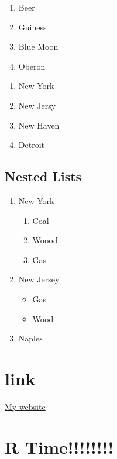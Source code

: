 \documentclass[]{article}
\providecommand{\tightlist}{%
  \setlength{\itemsep}{0pt}\setlength{\parskip}{0pt}}
\begin{document}
\begin{enumerate}
\def\labelenumi{\alph{enumi}.}
\tightlist
\item
  Beer
\item
  Guiness
\item
  Blue Moon
\item
  Oberon
\end{enumerate}

\begin{enumerate}
\def\labelenumi{\arabic{enumi}.}
\tightlist
\item
  New York
\item
  New Jersy
\item
  New Haven
\item
  Detroit
\end{enumerate}

\subsection{Nested Lists}\label{nested-lists}

\begin{enumerate}
\def\labelenumi{\arabic{enumi}.}
\tightlist
\item
  New York

  \begin{enumerate}
  \def\labelenumii{\arabic{enumii}.}
  \tightlist
  \item
    Coal
  \item
    Woood
  \item
    Gas
  \end{enumerate}
\item
  New Jersey

  \begin{itemize}
  \tightlist
  \item
    Gas
  \item
    Wood
  \end{itemize}
\item
  Naples
\end{enumerate}

\section{link}\label{link}

\href{http://www.hegdekiran.com}{My website}

\section{R Time!!!!!!!!}\label{r-time}
\end{document}
